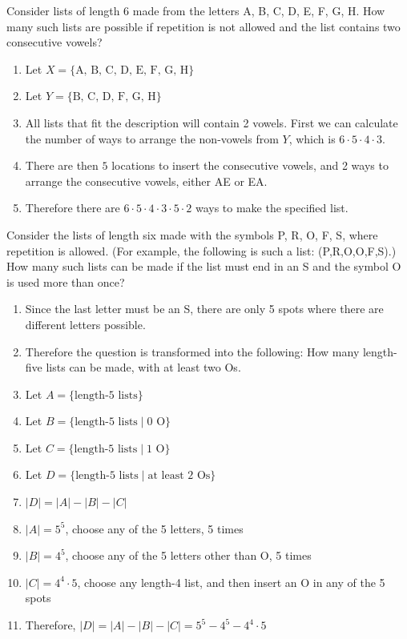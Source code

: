 \documentclass[openany, 11pt]{book}
\begin{document}
\begin{exercise}{}{}
	Consider lists of length 6 made from the letters A, B, C,
	D, E, F, G, H. How many such lists are possible if repetition is not allowed
	and the list contains two consecutive vowels?
	\begin{enumerate}[label={}, leftmargin=*, itemsep=0pt, parsep=0pt]
		\item Let $X=\{\text{A, B, C, D, E, F, G, H}\}$
		\item Let $Y=\{\text{B, C, D, F, G, H}\}$
		\item All lists that fit the description will contain 2 vowels. First we can
		      calculate the number of ways to arrange the non-vowels from $Y$, which is
		      $6\cdot5\cdot4\cdot3$.
		\item There are then $5$ locations to insert the consecutive vowels, and 2 ways
		      to arrange the consecutive vowels, either AE or EA.
		\item Therefore there are $6\cdot5\cdot4\cdot3 \cdot 5 \cdot 2$ ways to make the
		      specified list.
	\end{enumerate}
\end{exercise}

\begin{exercise}{}{}
	Consider the lists of length six made with the symbols P, R, O, F, S,
	where repetition is allowed. (For example, the following is such a list:
	(P,R,O,O,F,S).) How many such lists can be made if the list must end in an S
	and the symbol O is used more than once?
	\begin{enumerate}[label={\textbullet}, leftmargin=*, itemsep=0pt, parsep=0pt]
		\item Since the last letter must be an S, there are only 5 spots where there are
		      different letters possible.
		\item Therefore the question is transformed into the following: How many
		      \mbox{length-five} lists can be made, with at least two Os.
		\item Let $A=\{\text{length-5 lists}\}$
		\item Let $B=\{\text{length-5 lists}\mid\text{0 O}\}$
		\item Let $C=\{\text{length-5 lists}\mid\text{1 O}\}$
		\item Let $D=\{\text{length-5 lists}\mid\text{at least 2 Os}\}$
		\item $|D| = |A| - |B| - |C|$
		\item $|A| = 5^5$, choose any of the 5 letters, 5 times
		\item $|B| = 4^5$, choose any of the 5 letters other than O, 5 times
		\item $|C| = 4^4 \cdot 5$, choose any length-4 list, and then insert an O in any
		      of the 5 spots
		\item Therefore, $|D| = |A| - |B| - |C| = 5^5 - 4^5 - 4^4 \cdot 5$
	\end{enumerate}
\end{exercise}
\end{document}
